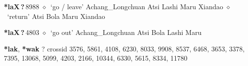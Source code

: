   \begin{list}{}{\leftmargin=1.5em \itemindent=-1.5em}
  \item {\footnotesize \textbf{*laX\,?\,}}{\tiny 8988}
         $\diamond$~`go / leave'
         Achang\_Longchuan 
\hspace{1ex}
         Atsi 
\hspace{1ex}
         Lashi 
\hspace{1ex}
         Maru 
\hspace{1ex}
         Xiandao 
\hspace{1ex}
         $\diamond$~`return'
         Atsi 
\hspace{1ex}
         Bola 
\hspace{1ex}
         Maru 
\hspace{1ex}
         Xiandao 
  \item {\footnotesize \textbf{*laX\,?\,}}{\tiny 4803}
\hspace{1ex}
         $\diamond$~`go out'
         Achang\_Longchuan 
\hspace{1ex}
         Atsi 
\hspace{1ex}
         Bola 
\hspace{1ex}
         Lashi 
\hspace{1ex}
         Maru 
  \end{list}
\item
\textbf{*lak}, \textbf{*wak}
?
  {\tiny crossid 3576, 5861, 4108, 6230, 8033, 9908, 8537, 6468, 3653, 3378, 7395, 13068, 5099, 4203, 2166, 10344, 6330, 5615, 8334, 11780}
